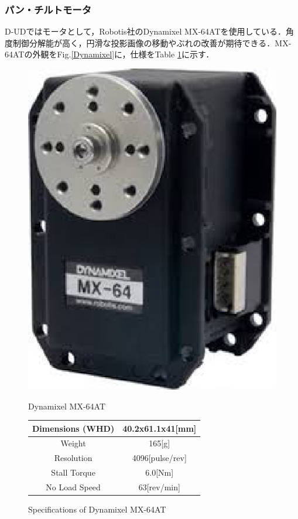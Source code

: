 \documentclass[12pt]{sonota/aislab}
\begin{document}
\subsubsection{パン・チルトモータ}
D-UDではモータとして，Robotis社のDynamixel MX-64ATを使用している．角度制御分解能が高く，円滑な投影画像の移動やぶれの改善が期待できる．MX-64ATの外観をFig.\ref{Dynamixel}に，仕様をTable \ref{table:Dynamixel}に示す．

\begin{figure}
\begin{minipage}{0.4\textwidth}
\begin{center}
\includegraphics[scale=0.4]{figs/MX_64AT.eps}
\caption{Dynamixel MX-64AT}
\label{Dynamixel}
\end{center}
\end{minipage}
\begin{minipage}{0.5\textwidth}
\begin{center}
\makeatletter
\def\@captype{table}
\makeatother
\caption{Specifications of Dynamixel MX-64AT}
	\begin{tabular}[tbp]{|c|c|}
		\hline 
		Dimensions (WHD) & 40.2x61.1x41[mm] \\\hline
		Weight & 165[g] \\\hline
		Resolution & 4096[pulse/rev] \\\hline
		Stall Torque & 6.0[Nm] \\\hline
		No Load Speed & 63[rev/min] \\\hline
	\end{tabular}
\label{table:Dynamixel}
\end{center}
\end{minipage}
\end{figure}
\end{document}
